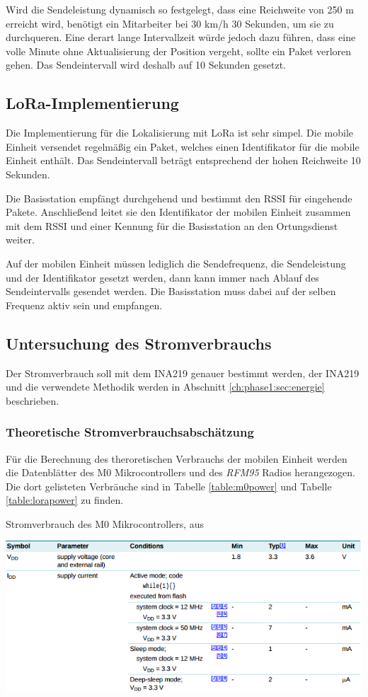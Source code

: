 Wird die Sendeleistung dynamisch so festgelegt, dass eine Reichweite von 250 m erreicht wird, benötigt ein Mitarbeiter bei 30 km/h 30 Sekunden, um sie zu durchqueren.
Eine derart lange Intervallzeit würde jedoch dazu führen, dass eine volle Minute ohne Aktualisierung der Position vergeht, sollte ein Paket verloren gehen.
Das Sendeintervall wird deshalb auf 10 Sekunden gesetzt.

\subsection{LoRa-Implementierung}
Die Implementierung für die Lokalisierung mit LoRa ist sehr simpel.
Die mobile Einheit versendet regelmäßig ein Paket, welches einen Identifikator für die mobile Einheit enthält.
Das Sendeintervall beträgt entsprechend der hohen Reichweite 10 Sekunden.

Die Basisstation empfängt durchgehend und bestimmt den RSSI für eingehende Pakete.
Anschließend leitet sie den Identifikator der mobilen Einheit zusammen mit dem RSSI und einer Kennung für die Basisstation an den Ortungsdienst weiter.

Auf der mobilen Einheit müssen lediglich die Sendefrequenz, die Sendeleistung und der Identifikator gesetzt werden, dann kann immer nach Ablauf des Sendeintervalls gesendet werden.
Die Basisstation muss dabei auf der selben Frequenz aktiv sein und empfangen.


\subsection{Untersuchung des Stromverbrauchs}
Der Stromverbrauch soll mit dem INA219 genauer bestimmt werden, der INA219 und die verwendete Methodik werden in Abschnitt \ref{ch:phase1:sec:energie} beschrieben.

\subsubsection{Theoretische Stromverbrauchsabschätzung}
Für die Berechnung des theroretischen Verbrauchs der mobilen Einheit werden die Datenblätter des M0 Mikrocontrollers und des \emph{RFM95} Radios herangezogen. 
Die dort gelisteten Verbräuche sind in Tabelle \ref{table:m0power} und Tabelle \ref{table:lorapower} zu finden.

\begin{table}[h]
  \centering
  \caption{Stromverbrauch des M0 Mikrocontrollers, aus \cite{nxp2016m0}}
	\includegraphics[width=\textwidth]{images/m0power.png}
  \label{table:m0power}
\end{table}

